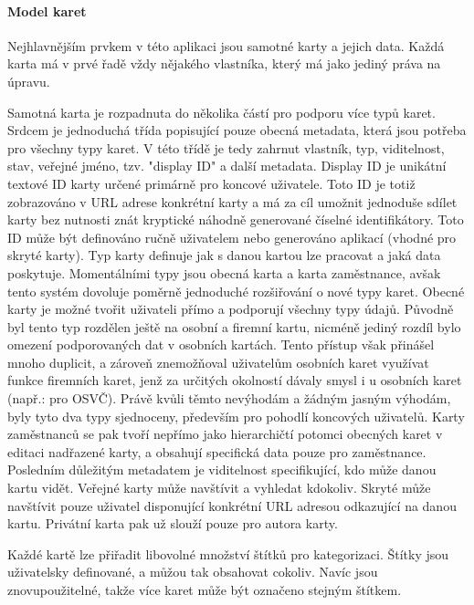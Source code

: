 		\paragraph{Model karet}


		Nejhlavnějším prvkem v této aplikaci jsou samotné karty a jejich data.
		Každá karta má v prvé řadě vždy nějakého vlastníka, který má jako jediný práva na
		úpravu.

		Samotná karta je rozpadnuta do několika částí pro podporu více typů karet.
		Srdcem je jednoduchá třída popisující pouze obecná metadata, která jsou potřeba pro všechny typy karet.
		V této třídě je tedy zahrnut vlastník, typ, viditelnost, stav, veřejné jméno, tzv. "display ID" a další metadata.
		Display ID je unikátní textové ID karty určené primárně pro koncové uživatele.
		Toto ID je totiž zobrazováno v \ac{URL} adrese konkrétní karty a má za cíl umožnit jednoduše sdílet karty bez nutnosti
		znát kryptické náhodně generované číselné identifikátory.
		Toto ID může být definováno ručně uživatelem nebo generováno aplikací (vhodné pro skryté karty).
		Typ karty definuje jak s danou kartou lze pracovat a jaká data poskytuje.
		Momentálními typy jsou obecná karta a karta zaměstnance, avšak tento systém dovoluje poměrně jednoduché rozšiřování
		o nové typy karet.
		Obecné karty je možné tvořit uživateli přímo a podporují všechny typy údajů.
		Původně byl tento typ rozdělen ještě na osobní a firemní kartu, nicméně jediný rozdíl bylo omezení podporovaných dat
		v osobních kartách.
		Tento přístup však přinášel mnoho duplicit, a zároveň znemožňoval uživatelům osobních karet využívat funkce
		firemních karet, jenž za určitých okolností dávaly smysl i u osobních karet (např.: pro OSVČ).
		Právě kvůli těmto nevýhodám a žádným jasným výhodám, byly tyto dva typy sjednoceny, především pro pohodlí
		koncových uživatelů.
		Karty zaměstnanců se pak tvoří nepřímo jako hierarchičtí potomci obecných karet v editaci nadřazené karty, a
		obsahují specifická data pouze pro zaměstnance.
		Posledním důležitým metadatem je viditelnost specifikující, kdo může danou kartu vidět.
		Veřejné karty může navštívit a vyhledat kdokoliv.
		Skryté může navštívit pouze uživatel disponující konkrétní \ac{URL} adresou odkazující na danou kartu.
		Privátní karta pak už slouží pouze pro autora karty.

		Každé kartě lze přiřadit libovolné množství štítků pro kategorizaci.
		Štítky jsou uživatelsky definované, a můžou tak obsahovat cokoliv.
		Navíc jsou znovupoužitelné, takže více karet může být označeno stejným štítkem.

